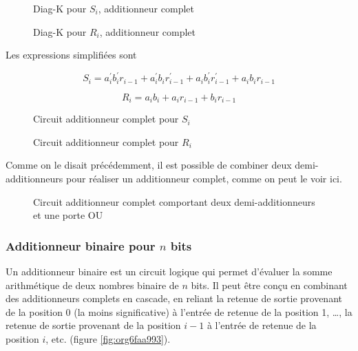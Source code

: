 \documentclass[11pt]{article}
\begin{document}
\begin{figure}[htbp]
\centering

\caption{\label{fig:org4bb4c0c}Diag-K pour \(S_i\), additionneur complet}
\end{figure}


\begin{figure}[htbp]
\centering

\caption{\label{fig:org9a10824}Diag-K pour \(R_i\), additionneur complet}
\end{figure}


Les expressions simplifiées sont 

$$ S_{i} = a_i^\prime b_i^\prime r_{i-1} + a_i^\prime b_i
r_{i-1}^\prime + a_i b_i^\prime r_{i-1}^\prime + a_i b_i r_{i-1} $$

$$ R_{i} = a_i b_i + a_i r_{i-1} + b_i r_{i-1} $$

\begin{figure}[htbp]
\centering

\caption{\label{fig:orgefb484f}Circuit additionneur complet pour \(S_i\)}
\end{figure}



\begin{figure}[htbp]
\centering

\caption{\label{fig:org3443bcf}Circuit additionneur complet pour \(R_i\)}
\end{figure}


Comme on le disait précédemment, il est possible de combiner deux
demi-additionneurs pour réaliser un additionneur complet, comme on
peut le voir ici.


\begin{figure}[htbp]
\centering

\caption{\label{fig:org36a6656}Circuit additionneur complet comportant deux demi-additionneurs et une porte OU}
\end{figure}

\subsubsection{Additionneur binaire pour \(n\) bits}
\label{sec:org3672397}

Un additionneur binaire est un circuit logique qui permet d'évaluer la
somme arithmétique de deux nombres binaire de \(n\) bits. Il peut être
conçu en combinant des additionneurs complets en cascade, en reliant
la retenue de sortie provenant de la position 0 (la moins
significative) à l'entrée de retenue de la position 1, \ldots{}, la retenue
de sortie provenant de la position \(i-1\) à l'entrée de retenue de la
position \(i\), etc. (figure \ref{fig:org6faa993}).
\end{document}
